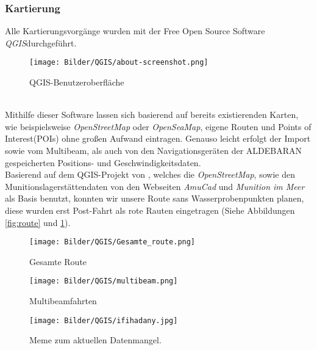 \subsubsection{Kartierung}
\label{kartierung}
Alle Kartierungsvorgänge wurden mit der Free Open Source Software\\ \emph{QGIS}\cite{qgis}durchgeführt.
\begin{figure}[ht]
    \centering
    \texttt{[image: Bilder/QGIS/about-screenshot.png]}
    \caption[fig:qgisabout]{QGIS-Benutzeroberfläche}
\end{figure}
\\Mithilfe dieser Software lassen sich basierend auf bereits existierenden Karten, 
wie beispielsweise \emph{OpenStreetMap}\cite{ostrm} oder \emph{OpenSeaMap}\cite{oseam}, eigene Routen und Points of \\Interest(POIs) ohne großen 
Aufwand eintragen. Genauso leicht erfolgt der Import sowie vom Multibeam,  als auch von den Navigationsgeräten der ALDEBARAN gespeicherten 
Positions- und Geschwindigkeitsdaten.\\


Basierend auf dem QGIS-Projekt von \jens, welches die \emph{OpenStreetMap}, sowie den Munitionslagerstättendaten von den Webseiten
\emph{AmuCad}\cite{amucad} und \emph{Munition im Meer}\cite{muninmeer}
als Basis benutzt, konnten wir unsere Route sans Wasserprobenpunkten planen, diese wurden erst Post-Fahrt als rote Rauten eingetragen (Siehe Abbildungen \ref{fig:route} und \ref{fig:multibeam_route}).
\begin{figure}[]
    \begin{minipage}{0.48\textwidth}
        \centering
        \texttt{[image: Bilder/QGIS/Gesamte\_route.png]}
        \caption{Gesamte Route}
        \label{fig:route}
    \end{minipage}
    \begin{minipage}{0.48\textwidth}
        \centering
        \texttt{[image: Bilder/QGIS/multibeam.png]}
        \caption{Multibeamfahrten}
        \label{fig:multibeam_route}
    \end{minipage}
\end{figure}

\begin{figure}[H]
    \begin{minipage}{0.9\textwidth}
        \centering
        \texttt{[image: Bilder/QGIS/ifihadany.jpg]}
        \caption{Meme zum aktuellen Datenmangel.}
\end{minipage}
\end{figure}

